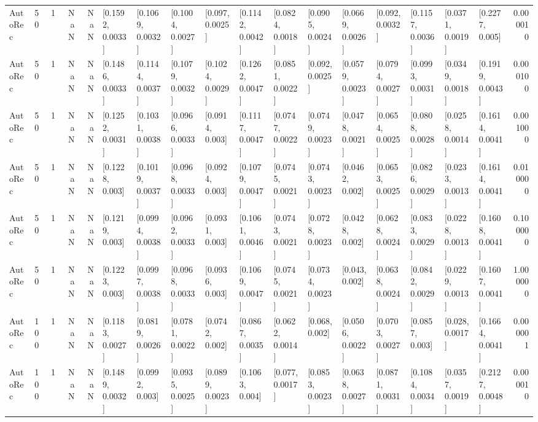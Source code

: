 \begin{tabular}{lllrrllllllllllllr}
 AutoRec &   50 &     1 &   NaN &   NaN &  [0.1592, 0.0033] &  [0.1069, 0.0032] &  [0.1004, 0.0027] &   [0.097, 0.0025] &  [0.1142, 0.0042] &  [0.0824, 0.0018] &  [0.0905, 0.0024] &  [0.0669, 0.0026] &   [0.092, 0.0032] &  [0.1157, 0.0036] &  [0.0371, 0.0019] &   [0.2277, 0.005] &  0.000010 \\
 AutoRec &   50 &     1 &   NaN &   NaN &  [0.1486, 0.0033] &  [0.1144, 0.0037] &  [0.1079, 0.0032] &  [0.1024, 0.0029] &  [0.1262, 0.0047] &  [0.0851, 0.0022] &   [0.092, 0.0025] &  [0.0579, 0.0023] &  [0.0794, 0.0027] &  [0.0993, 0.0031] &  [0.0349, 0.0018] &  [0.1919, 0.0043] &  0.000100 \\
 AutoRec &   50 &     1 &   NaN &   NaN &  [0.1252, 0.0031] &  [0.1031, 0.0038] &  [0.0966, 0.0033] &   [0.0914, 0.003] &  [0.1117, 0.0047] &  [0.0747, 0.0022] &  [0.0749, 0.0023] &  [0.0478, 0.0021] &  [0.0654, 0.0025] &  [0.0808, 0.0028] &  [0.0258, 0.0014] &  [0.1614, 0.0041] &  0.001000 \\
 AutoRec &   50 &     1 &   NaN &   NaN &   [0.1228, 0.003] &  [0.1019, 0.0037] &  [0.0968, 0.0033] &   [0.0924, 0.003] &  [0.1079, 0.0047] &  [0.0745, 0.0021] &  [0.0743, 0.0023] &   [0.0462, 0.002] &  [0.0653, 0.0025] &  [0.0826, 0.0029] &  [0.0233, 0.0013] &  [0.1614, 0.0041] &  0.010000 \\
 AutoRec &   50 &     1 &   NaN &   NaN &   [0.1219, 0.003] &  [0.0994, 0.0038] &  [0.0962, 0.0033] &   [0.0931, 0.003] &  [0.1061, 0.0046] &  [0.0743, 0.0021] &  [0.0728, 0.0023] &   [0.0428, 0.002] &  [0.0628, 0.0024] &  [0.0833, 0.0029] &  [0.0228, 0.0013] &  [0.1608, 0.0041] &  0.100000 \\
 AutoRec &   50 &     1 &   NaN &   NaN &   [0.1223, 0.003] &  [0.0997, 0.0038] &  [0.0968, 0.0033] &   [0.0936, 0.003] &  [0.1069, 0.0047] &  [0.0745, 0.0021] &  [0.0734, 0.0023] &    [0.043, 0.002] &  [0.0638, 0.0024] &  [0.0842, 0.0029] &  [0.0229, 0.0013] &  [0.1607, 0.0041] &  1.000000 \\
 AutoRec &  100 &     1 &   NaN &   NaN &  [0.1183, 0.0027] &  [0.0819, 0.0026] &  [0.0781, 0.0022] &   [0.0742, 0.002] &  [0.0867, 0.0035] &  [0.0622, 0.0014] &    [0.068, 0.002] &  [0.0506, 0.0022] &  [0.0703, 0.0027] &   [0.0857, 0.003] &   [0.028, 0.0017] &  [0.1664, 0.0041] &  0.000001 \\
 AutoRec &  100 &     1 &   NaN &   NaN &  [0.1489, 0.0032] &   [0.0992, 0.003] &  [0.0935, 0.0025] &  [0.0899, 0.0023] &   [0.1063, 0.004] &   [0.077, 0.0017] &  [0.0853, 0.0023] &  [0.0638, 0.0027] &  [0.0871, 0.0031] &  [0.1084, 0.0034] &  [0.0357, 0.0019] &  [0.2127, 0.0048] &  0.000010 \\

\end{tabular}
